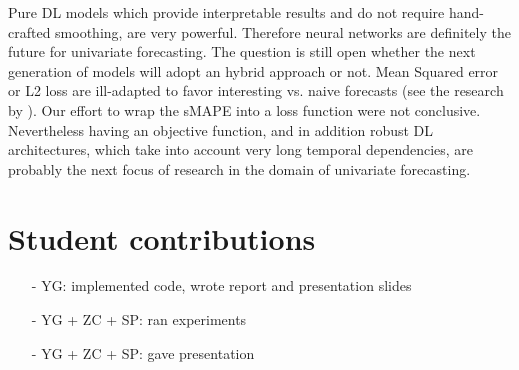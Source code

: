 \documentclass{article}
\begin{document}
Pure DL models which provide interpretable results and do not require hand-crafted smoothing, are very powerful. Therefore neural networks are definitely the future for univariate forecasting. 
The question is still open whether the next generation of models will adopt an hybrid approach or not. Mean Squared error or L2 loss are ill-adapted to favor interesting  vs. naive forecasts (see the research by  \citet{dilateloss}).
Our effort to wrap the sMAPE into a loss function were not conclusive. Nevertheless having an objective function, and in addition robust DL architectures, which take into account very long temporal dependencies,
are probably the next focus of research in the domain of univariate forecasting.

\newpage 
\section{Student contributions}
\begin{itemize}
	\item [-] YG: implemented code, wrote report and presentation slides
	\item [-] YG + ZC + SP: ran experiments
	\item [-] YG + ZC + SP: gave presentation
\end{itemize}




\end{document}
